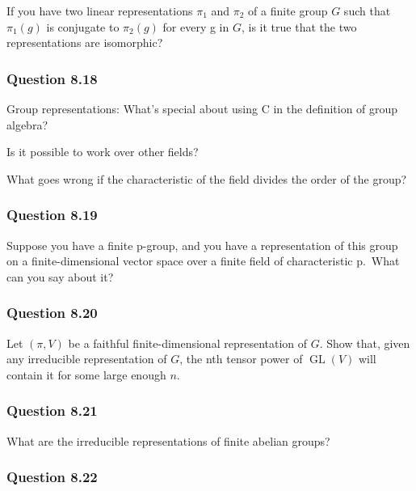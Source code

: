 If you have two linear representations \(\pi_1\) and \(\pi_2\) of a
finite group \(G\) such that \(\pi_1(g)\) is conjugate to \(\pi_2(g)\)
for every g in \(G\), is it true that the two representations are
isomorphic?

\hypertarget{question-8.18}{%
\subsubsection{Question 8.18}\label{question-8.18}}

Group representations: What's special about using C in the definition of
group algebra?

Is it possible to work over other fields?

What goes wrong if the characteristic of the field divides the order of
the group?

\hypertarget{question-8.19}{%
\subsubsection{Question 8.19}\label{question-8.19}}

Suppose you have a finite p-group, and you have a representation of this
group on a finite-dimensional vector space over a finite field of
characteristic p.~What can you say about it?

\hypertarget{question-8.20}{%
\subsubsection{Question 8.20}\label{question-8.20}}

Let \((\pi, V)\) be a faithful finite-dimensional representation of
\(G\). Show that, given any irreducible representation of \(G\), the nth
tensor power of \(\operatorname{GL}(V)\) will contain it for some large
enough \(n\).

\hypertarget{question-8.21}{%
\subsubsection{Question 8.21}\label{question-8.21}}

What are the irreducible representations of finite abelian groups?

\hypertarget{question-8.22}{%
\subsubsection{Question 8.22}\label{question-8.22}}

